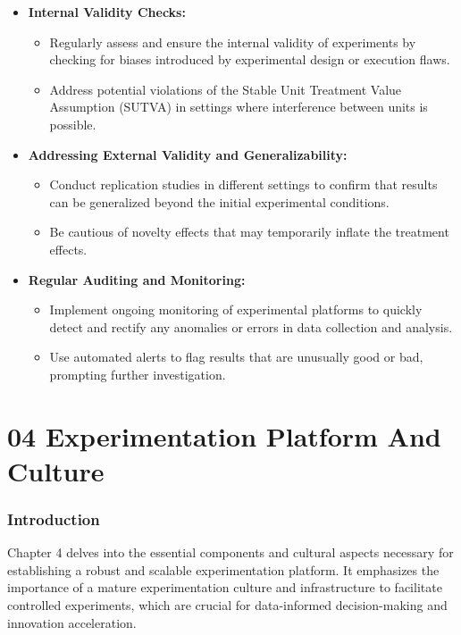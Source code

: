 \documentclass{article}
\begin{document}
\begin{itemize}
    \item \textbf{Internal Validity Checks:}
    \begin{itemize}
        \item Regularly assess and ensure the internal validity of experiments by checking for biases introduced by experimental design or execution flaws.
        \item Address potential violations of the Stable Unit Treatment Value Assumption (SUTVA) in settings where interference between units is possible.
    \end{itemize}

    \item \textbf{Addressing External Validity and Generalizability:}
    \begin{itemize}
        \item Conduct replication studies in different settings to confirm that results can be generalized beyond the initial experimental conditions.
        \item Be cautious of novelty effects that may temporarily inflate the treatment effects.
    \end{itemize}

    \item \textbf{Regular Auditing and Monitoring:}
    \begin{itemize}
        \item Implement ongoing monitoring of experimental platforms to quickly detect and rectify any anomalies or errors in data collection and analysis.
        \item Use automated alerts to flag results that are unusually good or bad, prompting further investigation.
    \end{itemize}
\end{itemize}

\section*{04 Experimentation Platform And Culture}
\subsubsection*{Introduction}
Chapter 4 delves into the essential components and cultural aspects necessary for establishing a robust and scalable experimentation platform. It emphasizes the importance of a mature experimentation culture and infrastructure to facilitate controlled experiments, which are crucial for data-informed decision-making and innovation acceleration.
\end{document}
